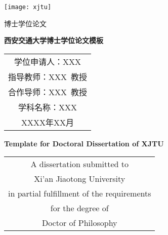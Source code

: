 
\begin{titlepage}
	\begin{center}
		\begin{figure*}[!ht]\vspace{4.5em}
			\centering
			\texttt{[image: xjtu]}
		\end{figure*}
		
		\vspace{1.5em}
		\begin{center} { 博士学位论文} \end{center}
		
		\vspace{8.5em}
		\begin{center} {\sanhao\bfseries{西安交通大学博士学位论文模板}}\end{center}
		
		\vspace{16em}
		{\sanhao
			\begin{center} \renewcommand{\arraystretch}{1.8}
				\begin{tabular}{c}
					学位申请人：XXX \\
					指导教师：XXX\,\,\,教授 \\
					合作导师：XXX\,\,\,教授 \\
					学科名称：XXX \\
					XXXX年XX月 \\
				\end{tabular} \renewcommand{\arraystretch}{1}
			\end{center}
		}
	\end{center}
	\clearpage{\pagestyle{empty}\cleardoublepage}
	
	\newpage\thispagestyle{empty}
	\begin{center}
		\parbox[t][0.4cm][t]{\textwidth}{}
		
		\begin{center}{\sanhao\bfseries {} Template for Doctoral Dissertation of XJTU}\end{center}
		
		\vspace{4.1cm}
		{\sanhao
			\begin{center} \renewcommand{\arraystretch}{1.35}
				\begin{tabular}{c}
					A dissertation submitted to  \\
					Xi'an Jiaotong University \\
					in partial fulfillment of the requirements \\
					for the degree of \\
					Doctor of Philosophy \\
				\end{tabular} \renewcommand{\arraystretch}{1}
			\end{center}
		}
		

\end{center}
\end{titlepage}
